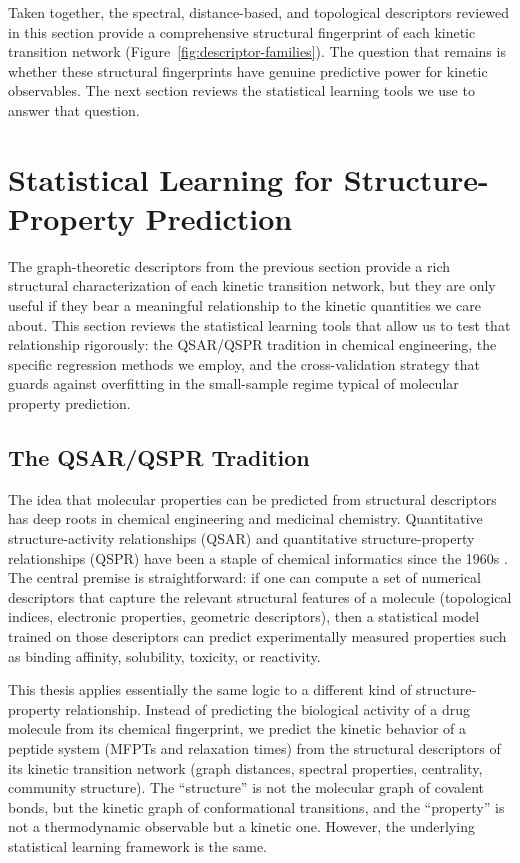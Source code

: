 Taken together, the spectral, distance-based, and topological descriptors reviewed in this section provide a comprehensive structural fingerprint of each kinetic transition network (Figure~\ref{fig:descriptor-families}). The question that remains is whether these structural fingerprints have genuine predictive power for kinetic observables. The next section reviews the statistical learning tools we use to answer that question.


\section{Statistical Learning for Structure-Property Prediction}\label{sec:ml-lit}

The graph-theoretic descriptors from the previous section provide a rich structural characterization of each kinetic transition network, but they are only useful if they bear a meaningful relationship to the kinetic quantities we care about. This section reviews the statistical learning tools that allow us to test that relationship rigorously: the QSAR/QSPR tradition in chemical engineering, the specific regression methods we employ, and the cross-validation strategy that guards against overfitting in the small-sample regime typical of molecular property prediction.

\subsection{The QSAR/QSPR Tradition}

The idea that molecular properties can be predicted from structural descriptors
has deep roots in chemical engineering and medicinal chemistry. Quantitative
structure-activity relationships (QSAR) and quantitative structure-property
relationships (QSPR) have been a staple of chemical informatics since the
1960s \cite{Cherkasov2014QSAR,Todeschini2000MolDescriptors}. The central
premise is straightforward: if one can compute a set of numerical descriptors
that capture the relevant structural features of a molecule (topological
indices, electronic properties, geometric descriptors), then a statistical
model trained on those descriptors can predict experimentally measured
properties such as binding affinity, solubility, toxicity, or reactivity.

This thesis applies essentially the same logic to a different kind of
structure-property relationship. Instead of predicting the biological activity
of a drug molecule from its chemical fingerprint, we predict the kinetic
behavior of a peptide system (MFPTs and relaxation times) from the structural
descriptors of its kinetic transition network (graph distances, spectral
properties, centrality, community structure). The ``structure'' is not the
molecular graph of covalent bonds, but the kinetic graph of conformational
transitions, and the ``property'' is not a thermodynamic observable but a
kinetic one. However, the underlying statistical learning framework is the
same.

